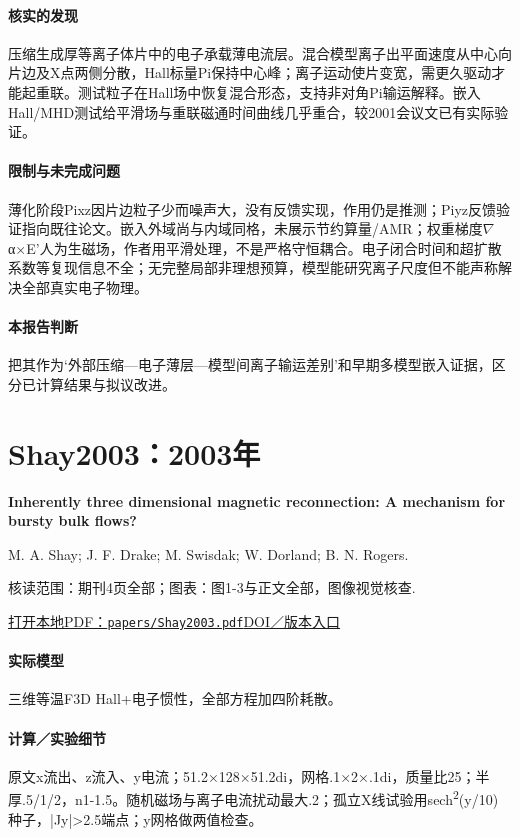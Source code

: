 \paragraph{核实的发现}压缩生成厚等离子体片中的电子承载薄电流层。混合模型离子出平面速度从中心向片边及X点两侧分散，Hall标量Pi保持中心峰；离子运动使片变宽，需更久驱动才能起重联。测试粒子在Hall场中恢复混合形态，支持非对角Pi输运解释。嵌入Hall/MHD测试给平滑场与重联磁通时间曲线几乎重合，较2001会议文已有实际验证。

\paragraph{限制与未完成问题}薄化阶段Pixz因片边粒子少而噪声大，没有反馈实现，作用仍是推测；Piyz反馈验证指向既往论文。嵌入外域尚与内域同格，未展示节约算量/AMR；权重梯度\ensuremath{\nabla}α×E'人为生磁场，作者用平滑处理，不是严格守恒耦合。电子闭合时间和超扩散系数等复现信息不全；无完整局部非理想预算，模型能研究离子尺度但不能声称解决全部真实电子物理。

\paragraph{本报告判断}把其作为‘外部压缩—电子薄层—模型间离子输运差别’和早期多模型嵌入证据，区分已计算结果与拟议改进。

\section{Shay2003：2003年}\label{paper:Shay2003}

\textbf{Inherently three dimensional magnetic reconnection: A mechanism for bursty bulk flows?}\citep{Shay2003}\

M. A. Shay;  J. F. Drake;  M. Swisdak;  W. Dorland;  B. N. Rogers.

\textsf{核读范围：}期刊4页全部；\textsf{图表：}图1-3与正文全部，图像视觉核查.

\href{run:papers/Shay2003.pdf}{打开本地PDF：\texttt{papers/Shay2003.pdf}}\quad\href{https://doi.org/10.1029/2002gl016267}{DOI／版本入口}

\paragraph{实际模型}三维等温F3D Hall+电子惯性，全部方程加四阶耗散。

\paragraph{计算／实验细节}原文x流出、z流入、y电流；51.2×128×51.2di，网格.1×2×.1di，质量比25；半厚.5/1/2，n1-1.5。随机磁场与离子电流扰动最大.2；孤立X线试验用sech\textsuperscript{2}(y/10)种子，|Jy|>2.5端点；y网格做两值检查。

